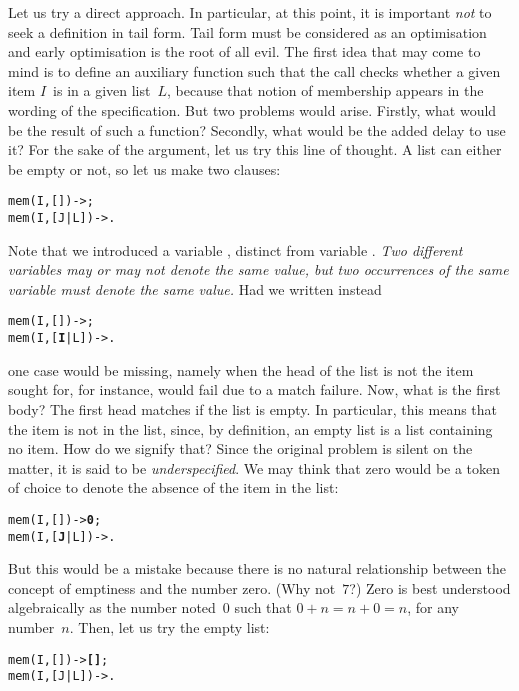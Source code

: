 Let us try a direct approach. In particular, at this point, it is
important \emph{not} to seek a definition in tail form. Tail form must
be considered as an optimisation and early optimisation is the root of
all evil. The first idea that may come to mind is to define an
auxiliary function  such that the call
 checks whether a given item \(I\)~is in a
given list~\(L\), because that notion of membership appears in the
wording of the specification. But two problems would arise. Firstly,
what would be the result of such a function?  Secondly, what would be
the added delay to use it? For the sake of the argument, let us try
this line of thought. A list can either be empty or not, so let us
make two clauses:
\begin{alltt}
mem(I,   []) -> ;
mem(I,[J|L]) -> .
\end{alltt}
Note that we introduced a variable , distinct from variable
. \emph{Two different variables may or may not denote the
  same value, but two occurrences of the same variable must denote the
  same value.} Had we written instead
\begin{alltt}
mem(I,   []) -> ;
mem(I,[\textbf{I}|L]) -> .\hfill% \emph{Error: two occurrences of} I
\end{alltt}
one case would be missing, namely when the head of the list is not the
item sought for, for instance,  would fail due to
a match failure. Now, what is the first body? The first head matches
if the list is empty. In particular, this means that the item is not
in the list, since, by definition, an empty list is a list containing
no item. How do we signify that? Since the original problem is silent
on the matter, it is said to be \emph{underspecified}. We may think
that zero would be a token of choice to denote the absence of the item
in the list:
\begin{alltt}
mem(I,   []) -> \textbf{0};
mem(I,[\textbf{J}|L]) -> .
\end{alltt}
But this would be a mistake because there is no natural relationship
between the concept of emptiness and the number zero. (Why not~\(7\)?)
Zero is best understood algebraically as the number noted~\(0\) such
that \(0 + n = n + 0 = n\), for any number~\(n\). Then, let us try the
empty list:
\begin{alltt}
mem(I,   []) -> \textbf{[]};\hfill% I \emph{is not reused}
mem(I,[J|L]) -> .
\end{alltt}
